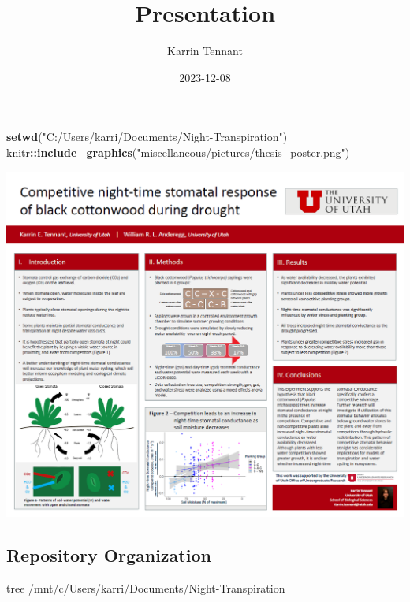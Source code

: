 \documentclass[
]{article}
\title{Presentation}
\author{Karrin Tennant}
\date{2023-12-08}
\newenvironment{Shaded}{\begin{snugshade}}{\end{snugshade}}
\newcommand{\ExtensionTok}[1]{#1}
\newcommand{\FunctionTok}[1]{\textcolor[rgb]{0.13,0.29,0.53}{\textbf{#1}}}
\newcommand{\NormalTok}[1]{#1}
\newcommand{\SpecialCharTok}[1]{\textcolor[rgb]{0.81,0.36,0.00}{\textbf{#1}}}
\newcommand{\StringTok}[1]{\textcolor[rgb]{0.31,0.60,0.02}{#1}}
\begin{document}
\maketitle

\begin{Shaded}
\begin{Highlighting}[]
\FunctionTok{setwd}\NormalTok{(}\StringTok{"C:/Users/karri/Documents/Night{-}Transpiration"}\NormalTok{)}
\NormalTok{knitr}\SpecialCharTok{::}\FunctionTok{include\_graphics}\NormalTok{(}\StringTok{"miscellaneous/pictures/thesis\_poster.png"}\NormalTok{)}
\end{Highlighting}
\end{Shaded}

\includegraphics{miscellaneous/pictures/thesis_poster.png}

\hypertarget{repository-organization}{%
\subsection{Repository Organization}\label{repository-organization}}

\begin{Shaded}
\begin{Highlighting}[]
\ExtensionTok{tree}\NormalTok{ /mnt/c/Users/karri/Documents/Night{-}Transpiration}
\end{Highlighting}
\end{Shaded}
\end{document}
